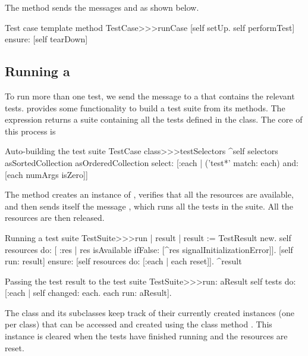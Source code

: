 \documentclass[a4paper,10pt,twoside]{book}
\begin{document}
The method  sends the messages
 and  as shown below.
\begin{method}[testcaseruncase]{Test case template method}
TestCase>>>runCase
	[self setUp.
	self performTest] ensure: [self tearDown]
\end{method}

\subsection{Running a }

To run more than one test, we send the message
 to a  that contains the relevant tests. 
 provides some functionality to build a test suite from
its methods.  The expression  returns a suite containing all the tests defined in the  class.
The core of this process is
\begin{method}[testcasetestselectors]{Auto-building the test suite}
TestCase class>>>testSelectors 
	^self selectors asSortedCollection asOrderedCollection select: [:each | 
		('test*' match: each) and: [each numArgs isZero]]
\end{method}

The method  creates an instance of
, verifies that all the resources are available, and then sends itself
the message , which runs all
the tests in the suite.  All the resources are then
released.
\begin{method}[testsuiterun]{Running a test suite}
TestSuite>>>run
	| result |
 	result := TestResult new.
	self resources do: [ :res |
		res isAvailable ifFalse: [^res signalInitializationError]].
	[self run: result] ensure: [self resources do: [:each | each reset]].
	^result
\end{method}

\begin{method}[testsuiterun:]{Passing the test result to the test suite}
TestSuite>>>run: aResult
	self tests do: [:each | 
		self changed: each.
		each run: aResult].
\end{method}
The class  and its subclasses keep track of
their currently created instances (one per class) that can be accessed
and created using the class method .  This instance is
cleared when the tests have finished running and the resources are
reset.
\end{document}
